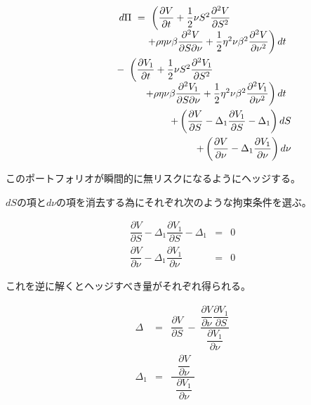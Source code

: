 \documentclass[uplatex,a4j,12pt,dvipdfmx]{jsarticle}
\begin{document}
\begin{eqnarray*}
	&&
	\begin{array}{l}
		d \Pi \ = \
		\left(
		\dfrac{\partial V}{\partial t}
		+
		\dfrac{1}{2}
		\nu S^{2}
		\dfrac{\partial^{2} V}{\partial S^{2}}
		\right.
		\\ \hspace{10mm}
		\left.
		+
		\rho \eta \nu \beta
		\dfrac{\partial^{2} V}{\partial S \partial \nu}
		+
		\dfrac{1}{2}
		\eta^{2} \nu \beta^{2}
		\dfrac{\partial^{2} V}{\partial \nu^{2}}
		\right)dt
	\end{array}
	\\ && \hspace{10mm}
	\begin{array}{l}
		- \
		\left(
		\dfrac{\partial V_{1}}{\partial t}
		+
		\dfrac{1}{2}
		\nu S^{2}
		\dfrac{\partial^{2} V_{1}}{\partial S^{2}}
		\right.
		\\ \hspace{10mm}
		\left.
		+
		\rho \eta \nu \beta
		\dfrac{\partial^{2} V_{1}}{\partial S \partial \nu}
		+
		\dfrac{1}{2}
		\eta^{2} \nu \beta^{2}
		\dfrac{\partial^{2} V_{1}}{\partial \nu^{2}}
		\right)dt
	\end{array}
	\\ &&
	\hspace{10mm} +
	\left(
	\dfrac{\partial V}{\partial S}
	-
	\Delta_{1}
	\dfrac{\partial V_{1}}{\partial S}
	-
	\Delta_{1}
	\right)
	dS
	\\ &&
	\hspace{10mm} +
	\left(
	\dfrac{\partial V}{\partial \nu}
	-
	\Delta_{1}
	\dfrac{\partial V_{1}}{\partial \nu}
	\right)
	d\nu
\end{eqnarray*}



このポートフォリオが瞬間的に無リスクになるようにヘッジする。

$dS$の項と$d\nu$の項を消去する為にそれぞれ次のような拘束条件を選ぶ。


\begin{eqnarray*}
	\dfrac{\partial V}{\partial S}
	-
	\Delta_{1}
	\dfrac{\partial V_{1}}{\partial S}
	-
	\Delta_{1}
	&=&
	0
	\\
	\dfrac{\partial V}{\partial \nu}
	-
	\Delta_{1}
	\dfrac{\partial V_{1}}{\partial \nu}
	&=&
	0
\end{eqnarray*}


これを逆に解くとヘッジすべき量がそれぞれ得られる。


\begin{eqnarray*}
	\Delta
	&=&
	\dfrac{\partial V}{\partial S}
	\ - \
	\dfrac{
		\dfrac{\partial V}{\partial \nu}
		\dfrac{\partial V_{1}}{\partial S}
	}{
		\dfrac{\partial V_{1}}{\partial \nu}
	}
	\\
	\Delta_{1}
	&=&
	\dfrac{ \ \
		\dfrac{\partial V}{\partial \nu}
		\
	}{ \ \
		\dfrac{\partial V_{1}}{\partial \nu}
		\
	}
\end{eqnarray*}
\end{document}
